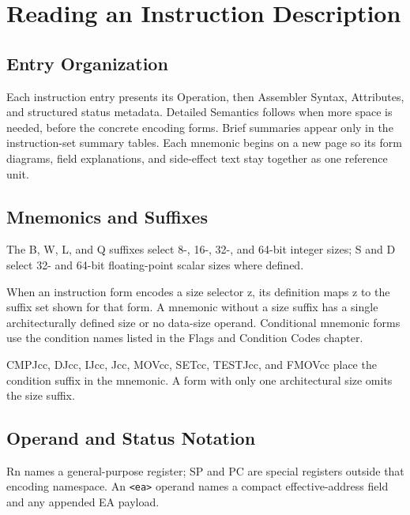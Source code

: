 \clearpage
\begingroup
\setlength{\parskip}{1pt}
\titlespacing*{\section}{0pt}{0.8em}{0.45em}
\titlespacing*{\subsection}{0pt}{0.45em}{0.25em}
\section*{Reading an Instruction Description}\label{page:reading-an-instruction-description}
{}
\subsection*{Entry Organization}
Each instruction entry presents its Operation, then Assembler Syntax, Attributes, and structured status
metadata. Detailed Semantics follows when more space is needed, before the concrete encoding forms. Brief
summaries appear only in the instruction-set summary tables. Each mnemonic begins on a new page so its
form diagrams, field explanations, and side-effect text stay together as one reference unit.

\subsection*{Mnemonics and Suffixes}
The B, W, L, and Q suffixes select 8-, 16-, 32-, and 64-bit integer sizes; S and D select 32- and 64-bit
floating-point scalar sizes where defined.

When an instruction form encodes a size selector z, its definition maps z to the suffix set shown for that form. A
mnemonic without a size suffix has a single architecturally defined size or no data-size operand.
Conditional mnemonic forms use the condition names listed in the Flags and Condition Codes chapter.

CMPJcc, DJcc, IJcc, Jcc, MOVcc, SETcc, TESTJcc, and FMOVcc place the condition suffix in the mnemonic. A form with
only one architectural size omits the size suffix.

\subsection*{Operand and Status Notation}
Rn names a general-purpose register; SP and PC are special registers outside that encoding namespace. An
\texttt{<ea>} operand names a compact effective-address field and any appended EA payload.

